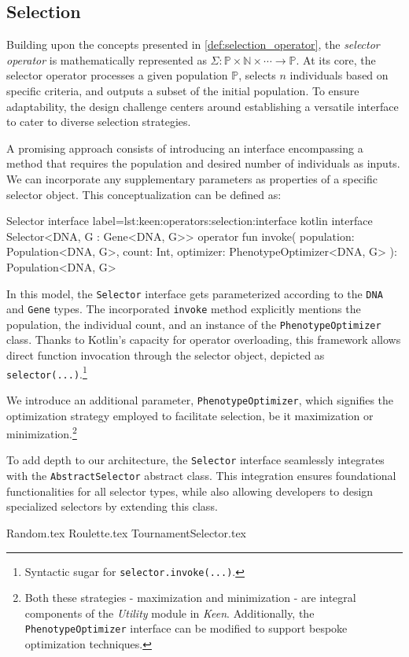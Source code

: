 \subsection{Selection}
\label{sec:keen:operators:selection}
  Building upon the concepts presented in \vref{def:selection_operator}, the 
  \emph{selector operator} is mathematically represented as \(\Sigma : \mathbb
  {P} \times \mathbb{N} \times \cdots \to \mathbb{P}\).
  At its core, the selector operator processes a given population 
  \(\mathbb{P}\), selects \(n\) individuals based on specific criteria, and 
  outputs a subset of the initial population.
  To ensure adaptability, the design challenge centers around establishing a 
  versatile interface to cater to diverse selection strategies.

  A promising approach consists of introducing an interface encompassing a 
  method that requires the population and desired number of individuals as 
  inputs.
  We can incorporate any supplementary parameters as properties of a specific 
  selector object.
  This conceptualization can be defined as:

  \begin{code}{Selector interface}{
    label=lst:keen:operators:selection:interface
  }{kotlin}
    interface Selector<DNA, G : Gene<DNA, G>> {
      operator fun invoke(
          population: Population<DNA, G>,
          count: Int,
          optimizer: PhenotypeOptimizer<DNA, G>
      ): Population<DNA, G>
    }
  \end{code}

  In this model, the \texttt{Selector} interface gets parameterized according 
  to the \texttt{DNA} and \texttt{Gene} types.
  The incorporated \texttt{invoke} method explicitly mentions the population, 
  the individual count, and an instance of the \texttt{PhenotypeOptimizer} 
  class.
  Thanks to Kotlin's capacity for operator overloading, this framework allows 
  direct function invocation through the selector object, depicted as \texttt
  {selector(...)}.\footnote{Syntactic sugar for \texttt{selector.invoke(...)}.}

  We introduce an additional parameter, \texttt{PhenotypeOptimizer}, which 
  signifies the optimization strategy employed to facilitate selection, be it 
  maximization or minimization.\footnote{
    Both these strategies - maximization and minimization - are integral 
    components of the \textit{Utility} module in \textit{Keen}.
    Additionally, the \texttt{PhenotypeOptimizer} interface can be modified to 
    support bespoke optimization techniques.
  }

  \begin{remark}
    To add depth to our architecture, the \texttt{Selector} interface 
    seamlessly integrates with the \texttt{AbstractSelector} abstract class.
    This integration ensures foundational functionalities for all selector 
    types, while also allowing developers to design specialized selectors by 
    extending this class.
  \end{remark}

  {Random.tex}
  {Roulette.tex}
  {TournamentSelector.tex}
